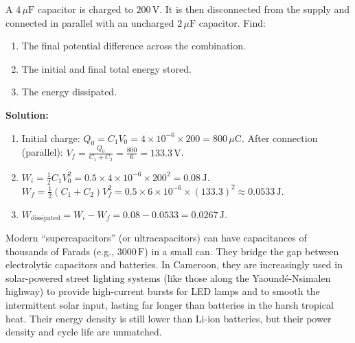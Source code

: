 \documentclass[11pt]{article}
\begin{document}
\begin{exoresolu}
A $4\,\mu\mathrm{F}$ capacitor is charged to $200\,\mathrm{V}$. It is then disconnected from the supply and connected in parallel with an uncharged $2\,\mu\mathrm{F}$ capacitor. Find:
\begin{enumerate}
\item The final potential difference across the combination.
\item The initial and final total energy stored.
\item The energy dissipated.
\end{enumerate}
\tcblower
\textbf{Solution:}
\begin{enumerate}
\item Initial charge: $Q_0 = C_1V_0 = 4\times10^{-6} \times 200 = 800\,\mu\mathrm{C}$.
After connection (parallel): $V_f = \frac{Q_0}{C_1+C_2} = \frac{800}{6} = 133.3\,\mathrm{V}$.
\item $W_i = \frac{1}{2}C_1V_0^2 = 0.5 \times 4\times10^{-6} \times 200^2 = 0.08\,\mathrm{J}$.
$W_f = \frac{1}{2}(C_1+C_2)V_f^2 = 0.5 \times 6\times10^{-6} \times (133.3)^2 \approx 0.0533\,\mathrm{J}$.
\item $W_{\text{dissipated}} = W_i - W_f = 0.08 - 0.0533 = 0.0267\,\mathrm{J}$.
\end{enumerate}
\end{exoresolu}

\begin{savaistu}
Modern ``supercapacitors'' (or ultracapacitors) can have capacitances of thousands of Farads (e.g., $3000\,\mathrm{F}$) in a small can. They bridge the gap between electrolytic capacitors and batteries. In Cameroon, they are increasingly used in solar-powered street lighting systems (like those along the Yaound\'e-Nsimalen highway) to provide high-current bursts for LED lamps and to smooth the intermittent solar input, lasting far longer than batteries in the harsh tropical heat. Their energy density is still lower than Li-ion batteries, but their power density and cycle life are unmatched.
\end{savaistu}
\end{document}
